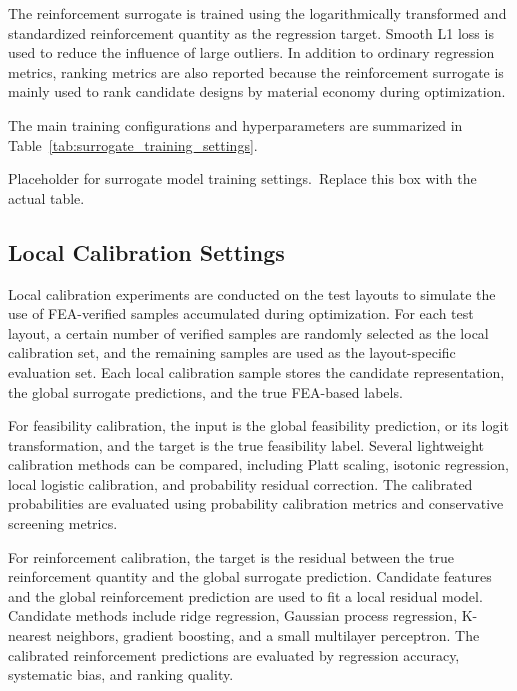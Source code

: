 The reinforcement surrogate is trained using the logarithmically transformed and standardized reinforcement quantity as the regression target. Smooth L1 loss is used to reduce the influence of large outliers. In addition to ordinary regression metrics, ranking metrics are also reported because the reinforcement surrogate is mainly used to rank candidate designs by material economy during optimization.

The main training configurations and hyperparameters are summarized in Table~\ref{tab:surrogate_training_settings}.

\begin{table}[t]
\centering
\caption{Training settings of global surrogate models.}
\label{tab:surrogate_training_settings}
\begin{minipage}[c][0.16\textheight][c]{0.92\textwidth}
\centering
Placeholder for surrogate model training settings.\
Replace this box with the actual table.
\end{minipage}
\end{table}

\subsection{Local Calibration Settings}
\label{subsec:local_calibration_settings}

Local calibration experiments are conducted on the test layouts to simulate the use of FEA-verified samples accumulated during optimization. For each test layout, a certain number of verified samples are randomly selected as the local calibration set, and the remaining samples are used as the layout-specific evaluation set. Each local calibration sample stores the candidate representation, the global surrogate predictions, and the true FEA-based labels.

For feasibility calibration, the input is the global feasibility prediction, or its logit transformation, and the target is the true feasibility label. Several lightweight calibration methods can be compared, including Platt scaling, isotonic regression, local logistic calibration, and probability residual correction. The calibrated probabilities are evaluated using probability calibration metrics and conservative screening metrics.

For reinforcement calibration, the target is the residual between the true reinforcement quantity and the global surrogate prediction. Candidate features and the global reinforcement prediction are used to fit a local residual model. Candidate methods include ridge regression, Gaussian process regression, K-nearest neighbors, gradient boosting, and a small multilayer perceptron. The calibrated reinforcement predictions are evaluated by regression accuracy, systematic bias, and ranking quality.

